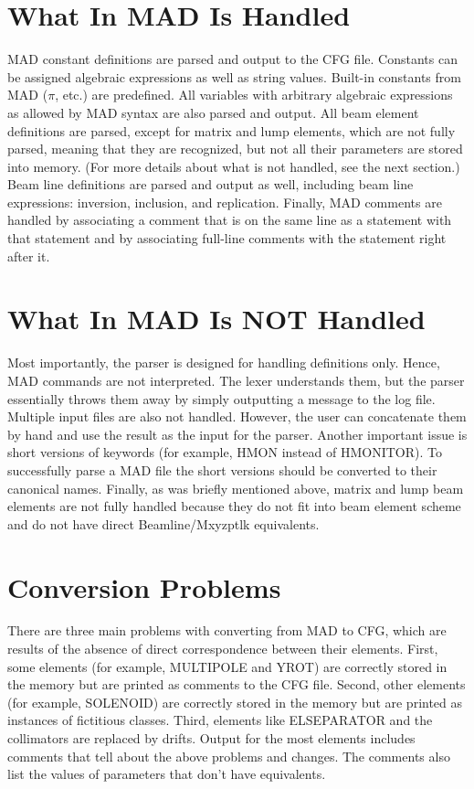 \documentclass[12pt]{article}
\begin{document}
\section{What In MAD Is Handled}
MAD constant definitions are parsed and output to the CFG file. Constants
can be assigned algebraic expressions as well as string values. Built-in
constants from MAD ($\pi$, etc.) are predefined. All variables with arbitrary
algebraic expressions as allowed by MAD syntax are also parsed and output.
All beam element definitions are parsed, except for matrix and lump elements,
which are not fully parsed, meaning that they are recognized, but not all their
parameters are stored into memory. (For more details about what is not handled,
see the next section.) Beam line definitions are parsed and output as well,
including beam line expressions: inversion, inclusion, and replication.
Finally, MAD comments are handled by associating a comment that is on the same
line as a statement with that statement and by associating full-line comments
with the statement right after it.

\section{What In MAD Is NOT Handled}
Most importantly, the parser is designed for handling definitions only. Hence,
MAD commands are not interpreted. The lexer understands them, but the parser
essentially throws them away by simply outputting a message to the log file.
Multiple input files are also not handled. However, the user can concatenate
them by hand and use the result as the input for the parser. Another important
issue is short versions of keywords (for example, HMON instead of HMONITOR).
To successfully parse a MAD file the short versions should be converted to
their canonical names. Finally, as was briefly mentioned above, matrix and
lump beam elements are not fully handled because they do not fit into beam
element scheme and do not have direct Beamline/Mxyzptlk equivalents.

\section{Conversion Problems}
There are three main problems with converting from MAD to CFG, which are
results of the absence of direct correspondence between their elements.
First, some elements (for example, MULTIPOLE and YROT) are correctly stored in
the memory but are printed as comments to the CFG file. Second, other elements
(for example, SOLENOID) are correctly stored in the memory but are printed as
instances of fictitious classes. Third, elements like ELSEPARATOR and the
collimators are replaced by drifts. Output for the most elements includes
comments that tell about the above problems and changes. The comments also
list the values of parameters that don't have equivalents.
\end{document}
